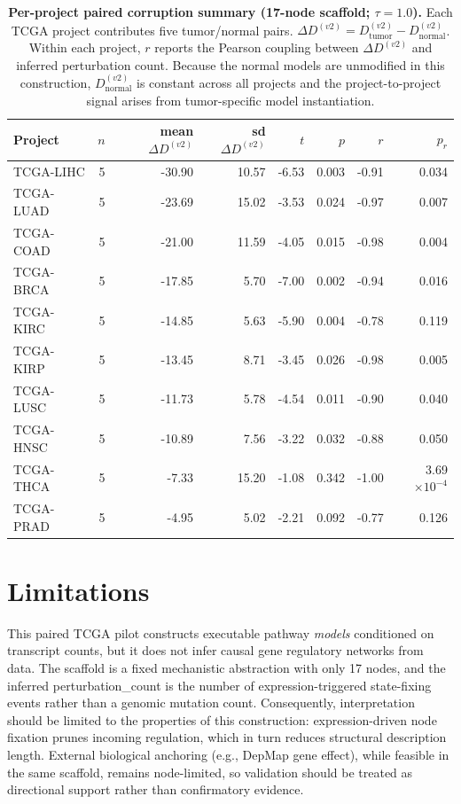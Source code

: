 \documentclass[11pt]{article}
\begin{document}
\begin{table}[H]
    \centering
    \caption{\textbf{Per-project paired corruption summary (17-node scaffold; $\tau=1.0$).} Each TCGA project contributes five tumor/normal pairs. $\Delta D^{(v2)} = D^{(v2)}_{\mathrm{tumor}} - D^{(v2)}_{\mathrm{normal}}$. Within each project, $r$ reports the Pearson coupling between $\Delta D^{(v2)}$ and inferred perturbation count. Because the normal models are unmodified in this construction, $D^{(v2)}_{\mathrm{normal}}$ is constant across all projects and the project-to-project signal arises from tumor-specific model instantiation.}
    \begin{tabular}{lrrrrrrr}
        \toprule
        Project & $n$ & mean $\Delta D^{(v2)}$ & sd $\Delta D^{(v2)}$ & $t$ & $p$ & $r$ & $p_r$ \\
        \midrule
        TCGA-LIHC & 5 & -30.90 & 10.57 & -6.53 & 0.003 & -0.91 & 0.034 \\
        TCGA-LUAD & 5 & -23.69 & 15.02 & -3.53 & 0.024 & -0.97 & 0.007 \\
        TCGA-COAD & 5 & -21.00 & 11.59 & -4.05 & 0.015 & -0.98 & 0.004 \\
        TCGA-BRCA & 5 & -17.85 & 5.70 & -7.00 & 0.002 & -0.94 & 0.016 \\
        TCGA-KIRC & 5 & -14.85 & 5.63 & -5.90 & 0.004 & -0.78 & 0.119 \\
        TCGA-KIRP & 5 & -13.45 & 8.71 & -3.45 & 0.026 & -0.98 & 0.005 \\
        TCGA-LUSC & 5 & -11.73 & 5.78 & -4.54 & 0.011 & -0.90 & 0.040 \\
        TCGA-HNSC & 5 & -10.89 & 7.56 & -3.22 & 0.032 & -0.88 & 0.050 \\
        TCGA-THCA & 5 & -7.33 & 15.20 & -1.08 & 0.342 & -1.00 & 3.69$\times 10^{-4}$ \\
        TCGA-PRAD & 5 & -4.95 & 5.02 & -2.21 & 0.092 & -0.77 & 0.126 \\
        \bottomrule
    \end{tabular}
\end{table}

\section*{Limitations}

This paired TCGA pilot constructs executable pathway \emph{models} conditioned on transcript counts, but it does not infer causal gene regulatory networks from data. The scaffold is a fixed mechanistic abstraction with only 17 nodes, and the inferred perturbation\_count is the number of expression-triggered state-fixing events rather than a genomic mutation count. Consequently, interpretation should be limited to the properties of this construction: expression-driven node fixation prunes incoming regulation, which in turn reduces structural description length. External biological anchoring (e.g., DepMap gene effect), while feasible in the same scaffold, remains node-limited, so validation should be treated as directional support rather than confirmatory evidence.
\end{document}

